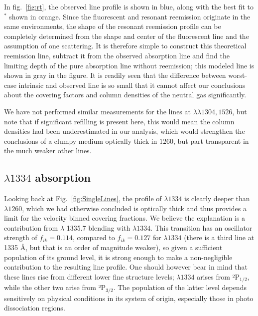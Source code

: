 \documentclass[twocolumn]{aastex61}
\begin{document}
In fig.~\ref{fig:rt}, the observed line profile is shown in blue, along
with the best fit to $^*$ shown in orange. Since the
fluorescent and resonant reemission originate in the same environments,
the shape of the resonant reemission profile can be completely
determined from the shape and center of the fluorescent line and the
assumption of one scattering. It is therefore simple to construct this
theoretical reemission line, subtract it from the observed absorption
line and find the limiting depth of the pure absorption line without
reemission; this modeled line is shown in gray in the figure. It is
readily seen that the difference between worst-case intrinsic and
observed line is so small that it cannot affect our conclusions about
the covering factors and column densities of the neutral gas
significantly.

We have not performed similar measurements for the lines at
$\lambda \lambda 1304, 1526$, but note that if significant refilling is
present here, this would mean the column densities had been
underestimated in our analysis, which would strengthen the conclusions
of a clumpy medium optically thick in  $1260$, but part
transparent in the much weaker other lines.

\subsection{ $\lambda 1334$
absorption}\label{lambda-1334-absorption}

Looking back at Fig.~\ref{fig:SingleLines}, the profile of 
$\lambda 1334$ is clearly deeper than  $\lambda 1260$, which
we had otherwise concluded is optically thick and thus provides a limit
for the velocity binned covering fractions. We believe the explanation
is a contribution from  $\lambda$ 1335.7 blending with
$\lambda 1334$. This transition has an oscillator strength of
$f_{ik} = 0.114$, compared to $f_{ik} = 0.127$ for $\lambda 1334$ (there
is a third line at 1335 Å, but that is an order of magnitude weaker), so
given a sufficient population of its ground level, it is strong enough
to make a non-negligible contribution to the resulting line profile. One
should however bear in mind that these lines rise from different lower
fine structure levels; $\lambda 1334$ arises from ²P$_{1/2}$, while the
other two arise from ²P$_{3/2}$. The population of the latter level
depends sensitively on physical conditions in its system of origin,
especially those in photo dissociation regions.
\end{document}
